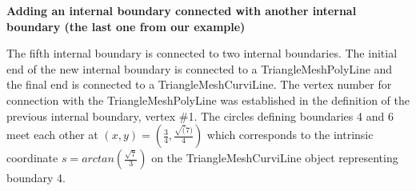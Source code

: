 {\bfseries  Adding an internal boundary connected with another internal boundary (the last one from our example) }

The fifth internal boundary is connected to two internal boundaries. The initial end of the new internal boundary is connected to a {\ttfamily Triangle\+Mesh\+Poly\+Line} and the final end is connected to a {\ttfamily Triangle\+Mesh\+Curvi\+Line}. The vertex number for connection with the {\ttfamily Triangle\+Mesh\+Poly\+Line} was established in the definition of the previous internal boundary, vertex \#1. The circles defining boundaries 4 and 6 meet each other at $(x, y) = (\frac{3}{4}, \frac{\sqrt(7)}{4})$ which corresponds to the intrinsic coordinate $ s = arctan(\frac{\sqrt{7}}{3}) $ on the {\ttfamily Triangle\+Mesh\+Curvi\+Line} object representing boundary 4.


